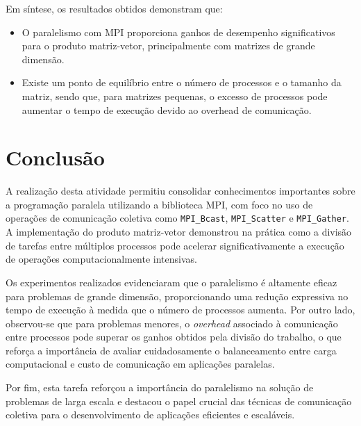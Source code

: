 \documentclass[a4paper, 12pt]{article}
\begin{document}
	\vspace{.5cm}
	
	Em síntese, os resultados obtidos demonstram que:
	
	\begin{itemize}
		\item O paralelismo com MPI proporciona ganhos de desempenho significativos para o produto matriz-vetor, principalmente com matrizes de grande dimensão.
		
		\item Existe um ponto de equilíbrio entre o número de processos e o tamanho da matriz, sendo que, para matrizes pequenas, o excesso de processos pode aumentar o tempo de execução devido ao overhead de comunicação.
	\end{itemize}
	
	\section{Conclusão}
	
	\hspace{0.62cm}A realização desta atividade permitiu consolidar conhecimentos importantes sobre a programação paralela utilizando a biblioteca MPI, com foco no uso de operações de comunicação coletiva como \texttt{MPI\_Bcast}, \texttt{MPI\_Scatter} e \texttt{MPI\_Gather}. A implementação do produto matriz-vetor demonstrou na prática como a divisão de tarefas entre múltiplos processos pode acelerar significativamente a execução de operações computacionalmente intensivas.
	
	Os experimentos realizados evidenciaram que o paralelismo é altamente eficaz para problemas de grande dimensão, proporcionando uma redução expressiva no tempo de execução à medida que o número de processos aumenta. Por outro lado, observou-se que para problemas menores, o \textit{overhead} associado à comunicação entre processos pode superar os ganhos obtidos pela divisão do trabalho, o que reforça a importância de avaliar cuidadosamente o balanceamento entre carga computacional e custo de comunicação em aplicações paralelas.
	
	Por fim, esta tarefa reforçou a importância do paralelismo na solução de problemas de larga escala e destacou o papel crucial das técnicas de comunicação coletiva para o desenvolvimento de aplicações eficientes e escaláveis.
	
\end{document}
